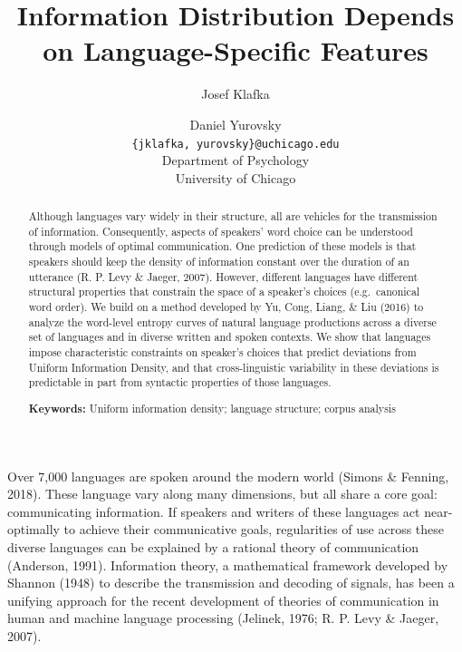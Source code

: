 \documentclass[10pt, letterpaper]{article}
\title{Information Distribution Depends on Language-Specific Features}
\author{Josef Klafka \and Daniel Yurovsky \\
        \texttt{\{jklafka, yurovsky\}@uchicago.edu} \\
       Department of Psychology \\ University of Chicago}
\begin{document}
\maketitle

\begin{abstract}
Although languages vary widely in their structure, all are vehicles for
the transmission of information. Consequently, aspects of speakers' word
choice can be understood through models of optimal communication. One
prediction of these models is that speakers should keep the density of
information constant over the duration of an utterance (R. P. Levy \&
Jaeger, 2007). However, different languages have different structural
properties that constrain the space of a speaker's choices
(e.g.~canonical word order). We build on a method developed by Yu, Cong,
Liang, \& Liu (2016) to analyze the word-level entropy curves of natural
language productions across a diverse set of languages and in diverse
written and spoken contexts. We show that languages impose
characteristic constraints on speaker's choices that predict deviations
from Uniform Information Density, and that cross-linguistic variability
in these deviations is predictable in part from syntactic properties of
those languages.

\textbf{Keywords:}
Uniform information density; language structure; corpus analysis
\end{abstract}

Over 7,000 languages are spoken around the modern world (Simons \&
Fenning, 2018). These language vary along many dimensions, but all share
a core goal: communicating information. If speakers and writers of these
languages act near-optimally to achieve their communicative goals,
regularities of use across these diverse languages can be explained by a
rational theory of communication (Anderson, 1991). Information theory, a
mathematical framework developed by Shannon (1948) to describe the
transmission and decoding of signals, has been a unifying approach for
the recent development of theories of communication in human and machine
language processing (Jelinek, 1976; R. P. Levy \& Jaeger, 2007).
\end{document}
